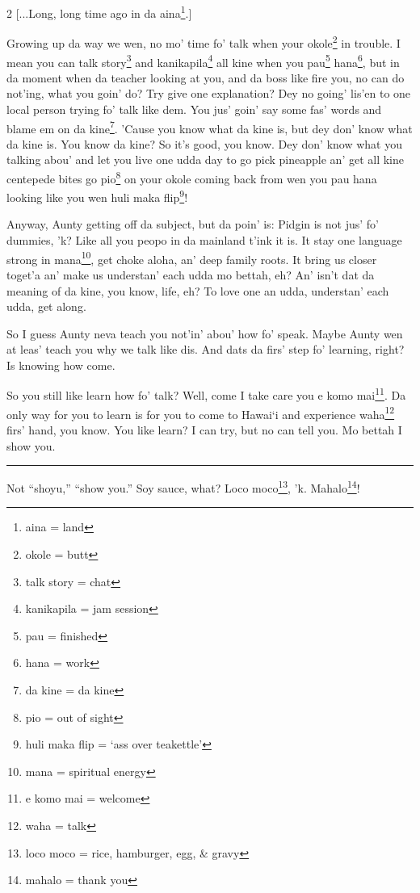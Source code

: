 \documentclass[12pt]{article}%
\begin{document}
\begin{multicols}{2}
[...Long, long time ago in da aina\footnote{aina = land}.]

Growing up da way we wen, no mo' time fo' talk when your okole\footnote{okole = butt} in trouble. I mean you can talk story\footnote{talk story = chat} and kanikapila\footnote{kanikapila = jam session} all kine when you pau\footnote{pau = finished} hana\footnote{hana = work}, but in da moment when da teacher looking at you, and da boss like fire you, no can do not'ing, what you goin' do? Try give one explanation? Dey no going' lis'en to one local person trying fo' talk like dem. You jus' goin' say some fas' words and blame em on da kine\footnote{da kine = da kine}. 'Cause you know what da kine is, but dey don' know what da kine is. You know da kine? So it's good, you know. Dey don' know what you talking abou' and let you live one udda day to go pick pineapple an' get all kine centepede bites go pio\footnote{pio = out of sight} on your okole coming back from wen you pau hana looking like you wen huli maka flip\footnote{huli maka flip = `ass over teakettle'}!

Anyway, Aunty getting off da subject, but da poin' is: Pidgin is not jus' fo' dummies, 'k? Like all you peopo in da mainland t'ink it is. It stay one language strong in mana\footnote{mana = spiritual energy}, get choke aloha, an' deep family roots. It bring us closer toget'a an' make us understan' each udda mo bettah, eh? An' isn't dat da meaning of da kine, you know, life, eh? To love one an udda, understan' each udda, get along. 

So I guess Aunty neva teach you not'in' abou' how fo' speak. Maybe Aunty wen at leas' teach you why we talk like dis. And dats da firs' step fo' learning, right? Is knowing how come. 

So you still like learn how fo' talk? Well, come I take care you e komo mai\footnote{e komo mai = welcome}. Da only way for you to learn is for you to come to Hawai`i and experience waha\footnote{waha = talk} firs' hand, you know. You like learn? I can try, but no can tell you. Mo bettah I show you.

\end{multicols}

\hrule
\vspace{5mm}

Not ``shoyu,'' ``show you.'' Soy sauce, what? Loco moco\footnote{loco moco = rice, hamburger, egg, \& gravy}, 'k. Mahalo\footnote{mahalo = thank you}!
\end{document}
